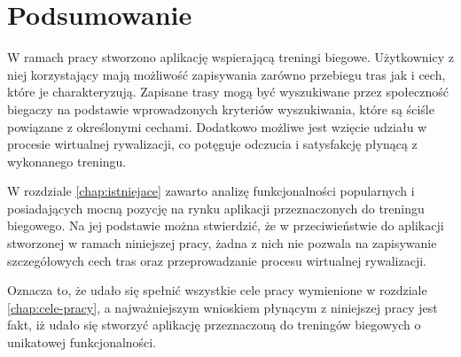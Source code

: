 \chapter{Podsumowanie}\label{chap:introduction}
W ramach pracy stworzono aplikację wspierającą treningi biegowe. Użytkownicy z niej korzystający mają możliwość zapisywania zarówno przebiegu tras jak i cech, które je charakteryzują. Zapisane trasy mogą być wyszukiwane przez społeczność biegaczy na podstawie wprowadzonych kryteriów wyszukiwania, które są ściśle powiązane z określonymi cechami. Dodatkowo możliwe jest wzięcie udziału w procesie wirtualnej rywalizacji, co potęguje odczucia i satysfakcję płynącą z wykonanego treningu. 

W rozdziale \ref{chap:istniejace} zawarto analizę funkcjonalności popularnych i posiadających mocną pozycję na rynku aplikacji przeznaczonych do treningu biegowego. Na jej podstawie można stwierdzić, że w przeciwieństwie do aplikacji stworzonej w ramach niniejszej pracy, żadna z nich nie pozwala na zapisywanie szczegółowych cech tras oraz przeprowadzanie procesu wirtualnej rywalizacji.

Oznacza to, że udało się spełnić wszystkie cele pracy wymienione w rozdziale \ref{chap:cele-pracy}, a najważniejszym wnioskiem płynącym z niniejszej pracy jest fakt, iż udało się stworzyć aplikację przeznaczoną do treningów biegowych o unikatowej funkcjonalności.